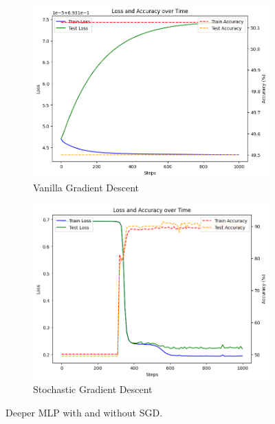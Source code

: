 \documentclass[12pt]{article}
\begin{document}
\begin{figure}[tb]
    \centering
    \begin{subfigure}{0.45\textwidth}
        \includegraphics[width=\linewidth]{fig_sec3_exp2_1.png}
        \caption{Vanilla Gradient Descent}
    \end{subfigure}
    \begin{subfigure}{0.45\textwidth}
        \includegraphics[width=\linewidth]{fig_sec3_exp2_2.png}
        \caption{Stochastic Gradient Descent}
    \end{subfigure}
    \caption{Deeper MLP with and without SGD.}
    \label{fig:sec3_exp2_12}
\end{figure}




 
\end{document}
